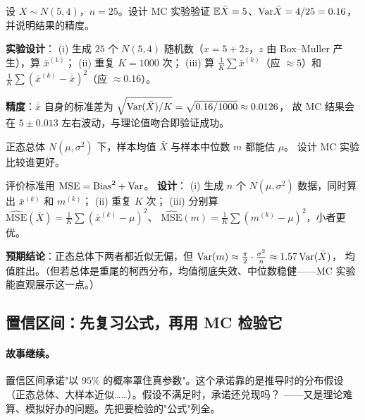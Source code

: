 \begin{exbox}
设 $X\sim N(5,4)$，$n=25$。设计 MC 实验验证 $\mathbb{E}\bar X=5$、$\mathrm{Var}\bar X=4/25=0.16$，并说明结果的精度。
\end{exbox}
\begin{sol}
\textbf{实验设计}：
(i) 生成 $25$ 个 $N(5,4)$ 随机数（$x=5+2z$，$z$ 由 Box--Muller 产生），算 $\bar x^{(1)}$；
(ii) 重复 $K=1000$ 次；
(iii) 算 $\frac1K\sum\bar x^{(k)}$（应 $\approx5$）和
$\frac1K\sum(\bar x^{(k)}-\overline{\bar x})^2$（应 $\approx0.16$）。

\textbf{精度}：$\overline{\bar x}$ 自身的标准差为
$\sqrt{\mathrm{Var}(\bar X)/K}=\sqrt{0.16/1000}\approx0.0126$，
故 MC 结果会在 $5\pm0.013$ 左右波动，与理论值吻合即验证成功。
\end{sol}

\begin{exbox}[MC 比较两个估计量]
正态总体 $N(\mu,\sigma^2)$ 下，样本均值 $\bar X$ 与样本中位数 $m$ 都能估 $\mu$。
设计 MC 实验比较谁更好。
\end{exbox}
\begin{sol}
评价标准用 $\mathrm{MSE}=\mathrm{Bias}^2+\mathrm{Var}$。
\textbf{设计}：
(i) 生成 $n$ 个 $N(\mu,\sigma^2)$ 数据，同时算出 $\bar x^{(k)}$ 和 $m^{(k)}$；
(ii) 重复 $K$ 次；
(iii) 分别算
$\widehat{\mathrm{MSE}}(\bar X)=\frac1K\sum(\bar x^{(k)}-\mu)^2$、
$\widehat{\mathrm{MSE}}(m)=\frac1K\sum(m^{(k)}-\mu)^2$，小者更优。

\textbf{预期结论}：正态总体下两者都近似无偏，但
$\mathrm{Var}(m)\approx\frac{\pi}{2}\cdot\frac{\sigma^2}{n}\approx1.57\,\mathrm{Var}(\bar X)$，
均值胜出。（但若总体是重尾的柯西分布，均值彻底失效、中位数稳健——MC 实验能直观展示这一点。）
\end{sol}

\subsection{置信区间：先复习公式，再用 MC 检验它}

\paragraph{故事继续。}
置信区间承诺"以 $95\%$ 的概率罩住真参数"。这个承诺靠的是推导时的分布假设
（正态总体、大样本近似……）。假设不满足时，承诺还兑现吗？
——又是理论难算、模拟好办的问题。先把要检验的"公式"列全。

